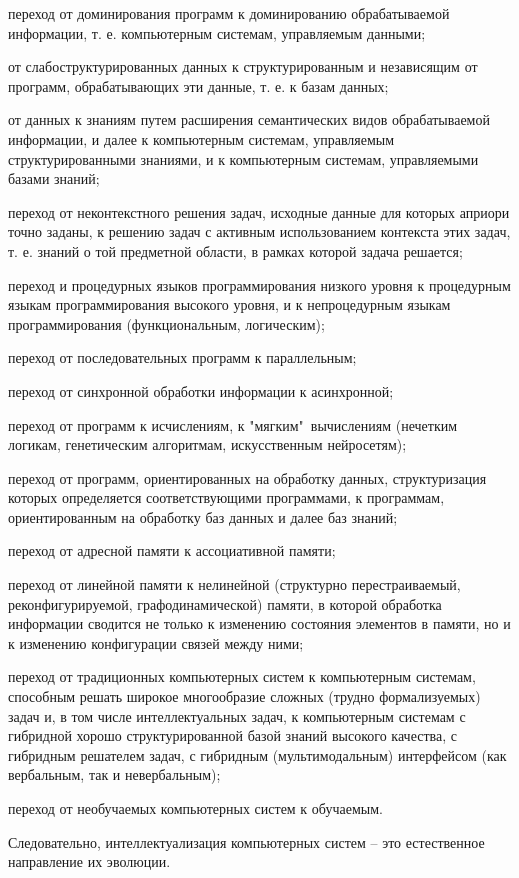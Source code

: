 \begin{SCn}
{\begin{scnitemize}
    \item переход от доминирования программ к доминированию обрабатываемой информации, т. е. компьютерным системам, управляемым данными;
    \item от слабоструктурированных данных к структурированным и независящим от программ, обрабатывающих эти данные, т. е. к базам данных;
    \item от данных к знаниям путем расширения семантических видов обрабатываемой информации, и далее к компьютерным системам, управляемым структурированными знаниями, и к компьютерным системам, управляемыми базами знаний;
    \item переход от неконтекстного решения задач, исходные данные для которых априори точно заданы, к решению задач с активным использованием контекста этих задач, т. е. знаний о той предметной области, в рамках которой задача решается;
    \item переход и процедурных языков программирования низкого уровня к процедурным языкам программирования высокого уровня, и к непроцедурным языкам программирования (функциональным, логическим);
    \item переход от последовательных программ к параллельным;
    \item переход от синхронной обработки информации к асинхронной;
    \item переход от программ к исчислениям, к "мягким"\ вычислениям (нечетким логикам, генетическим алгоритмам, искусственным нейросетям);
    \item переход от программ, ориентированных на обработку данных, структуризация которых определяется соответствующими программами, к программам, ориентированным на обработку баз данных и далее баз знаний;
    \item переход от адресной памяти к ассоциативной памяти;
    \item переход от линейной памяти к нелинейной (структурно перестраиваемый, реконфигурируемой, графодинамической) памяти, в которой обработка информации сводится не только к изменению состояния элементов в памяти, но и к изменению конфигурации связей между ними;
    \item переход от традиционных компьютерных систем к компьютерным системам, способным решать широкое многообразие сложных (трудно формализуемых) задач и, в том числе интеллектуальных задач, к компьютерным системам с гибридной хорошо структурированной базой знаний высокого качества, с гибридным решателем задач, с гибридным (мультимодальным) интерфейсом (как вербальным, так и невербальным);
    \item переход от необучаемых компьютерных систем к обучаемым.
\end{scnitemize}

Следовательно, интеллектуализация компьютерных систем -- это естественное направление их эволюции.}

\scnendstruct

\end{SCn}